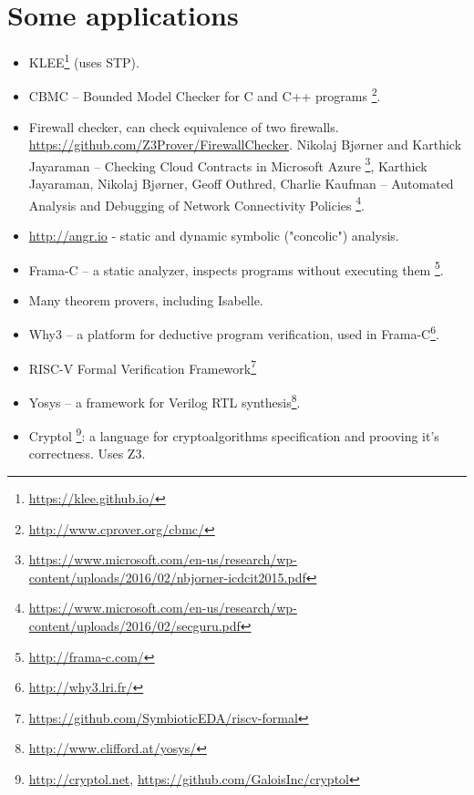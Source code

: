 \chapter{Some applications}

\begin{itemize}

\item KLEE\footnote{\url{https://klee.github.io/}} (uses STP).

\item CBMC -- Bounded Model Checker for C and C++ programs
\footnote{\url{http://www.cprover.org/cbmc/}}.

\item Firewall checker, can check equivalence of two firewalls.
\url{https://github.com/Z3Prover/FirewallChecker}.
Nikolaj Bjørner and Karthick Jayaraman -- Checking Cloud Contracts in Microsoft Azure
\footnote{\url{https://www.microsoft.com/en-us/research/wp-content/uploads/2016/02/nbjorner-icdcit2015.pdf}},
Karthick Jayaraman, Nikolaj Bjørner, Geoff Outhred, Charlie Kaufman -- Automated Analysis and Debugging of Network Connectivity Policies
\footnote{\url{https://www.microsoft.com/en-us/research/wp-content/uploads/2016/02/secguru.pdf}}.

\item \url{http://angr.io} - static and dynamic symbolic ("concolic") analysis.

\item Frama-C -- a static analyzer, inspects programs without executing them
\footnote{\url{http://frama-c.com/}}.

\item Many theorem provers, including Isabelle.

\item Why3 -- a platform for deductive program verification,
used in Frama-C\footnote{\url{http://why3.lri.fr/}}.

\item RISC-V Formal Verification Framework\footnote{\url{https://github.com/SymbioticEDA/riscv-formal}}

\item Yosys -- a framework for Verilog RTL synthesis\footnote{\url{http://www.clifford.at/yosys/}}.

\item Cryptol
\footnote{\url{http://cryptol.net}, \url{https://github.com/GaloisInc/cryptol}}:
a language for cryptoalgorithms specification and prooving it's correctness. Uses Z3.

\end{itemize}

